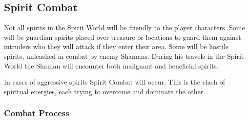 \subsection{Spirit Combat}
\label{ssec:spirit-combat}
Not all spirits in the Spirit World will be friendly to the player characters. Some will be guardian spirits placed over treasure or locations to guard them against intruders who they will attack if they enter their area. Some will be hostile spirits, unleashed in combat by enemy Shamans. During his travels in the Spirit World the Shaman will encounter both malignant and beneficial spirits.

In cases of aggressive spirits Spirit Combat will occur. This is the clash of spiritual energies, each trying to overcome and dominate the other.

\subsubsection{Combat Process}
